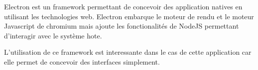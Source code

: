 Electron est un framework permettant de concevoir des application natives en utilisant les technologies web.
Electron embarque le moteur de rendu et le moteur Javascript de chromium mais ajoute les fonctionalités de NodeJS permettant d'interagir avec le système hote.

L'utilisation de ce framework est interessante dans le cas de cette application car elle permet de concevoir des interfaces simplement.

